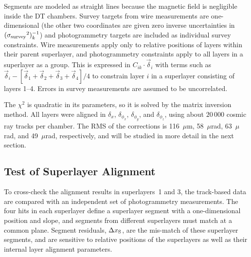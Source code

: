 \documentclass[11pt,twoside,a4paper,cmspaper]{cms-tdr}
\begin{document}
Segments are modeled as straight lines because the magnetic
field is negligible inside the DT chambers.  Survey targets from wire
measurements are one-dimensional (the other two coordinates are given
zero inverse uncertainties in $({\sigma_{\mbox{\scriptsize
survey}}}^2)_k^{-1}$) and photogrammetry targets are included as
individual survey constraints.  Wire measurements apply only to
relative positions of layers within their parent superlayer, and
photogrammetry constraints apply to all layers in a superlayer as a
group.  This is expressed in $C_{ik} \cdot \vec{\delta}_i$ with terms
such as $\vec{\delta}_i - [\vec{\delta}_1 + \vec{\delta}_2
+ \vec{\delta}_3 + \vec{\delta}_4]/4$ to constrain layer $i$ in a
superlayer consisting of layers 1--4.  Errors in survey measurements
are assumed to be uncorrelated.

The $\chi^2$ is quadratic in its parameters, so it is solved by the matrix
inversion method.  All layers were aligned in $\delta_x$, $\delta_{\phi_x}$,
$\delta_{\phi_y}$, and $\delta_{\phi_z}$, using about $20\,000$ cosmic
ray tracks per chamber.  The RMS of the corrections is 116~$\mu$m,
58~$\mu$rad, 63~$\mu$rad, and 49~$\mu$rad, respectively, and will be
studied in more detail in the next section.

\subsection{Test of Superlayer Alignment}
\label{sec:superlayertest}

To cross-check the alignment results in superlayers~1 and 3, the
track-based data are compared with an independent set of photogrammetry
measurements.  The four hits in each superlayer define a superlayer
segment with a one-dimensional position and slope, and segments from
different superlayers must match at a common plane.  Segment residuals,
$\Delta x_{\mbox{\scriptsize S}}$, are the mis-match of these superlayer
segments, and are sensitive to relative positions of the superlayers as well as their
internal layer alignment parameters.
\end{document}
